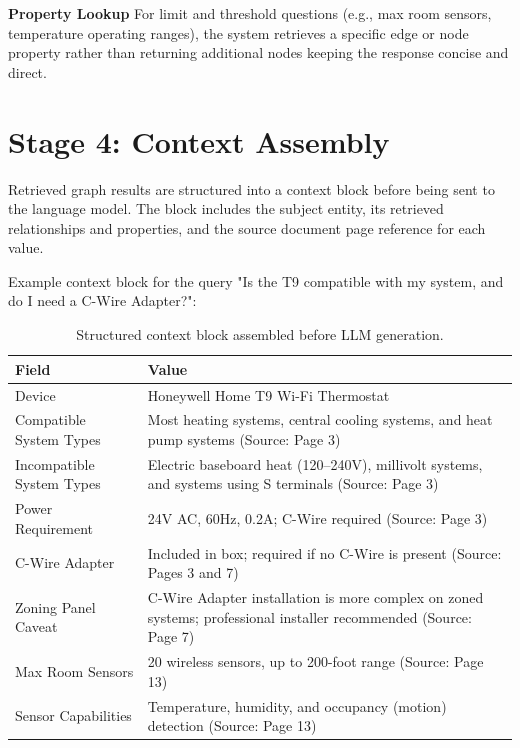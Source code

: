 \documentclass[11pt,a4paper]{article}
\begin{document}
\textbf{Property Lookup}
For limit and threshold questions (e.g., max room sensors, temperature operating ranges), the system retrieves a specific edge or node property rather than returning additional nodes keeping the response concise and direct.

\section{Stage 4: Context Assembly}
Retrieved graph results are structured into a context block before being sent to the language model. The block includes the subject entity, its retrieved relationships and properties, and the source document page reference for each value.

Example context block for the query "Is the T9 compatible with my system, and do I need a C-Wire Adapter?":

\begin{table}[H]
\centering
\small
\setlength{\tabcolsep}{6pt}
\begin{tabularx}{\textwidth}{L{0.30\textwidth}Y}
\toprule
{}
\textbf{Field} & \textbf{Value} \\
\midrule
Device & Honeywell Home T9 Wi-Fi Thermostat \\
Compatible System Types & Most heating systems, central cooling systems, and heat pump systems (Source: Page 3) \\
Incompatible System Types & Electric baseboard heat (120--240V), millivolt systems, and systems using S terminals (Source: Page 3) \\
Power Requirement & 24V AC, 60Hz, 0.2A; C-Wire required (Source: Page 3) \\
C-Wire Adapter & Included in box; required if no C-Wire is present (Source: Pages 3 and 7) \\
Zoning Panel Caveat & C-Wire Adapter installation is more complex on zoned systems; professional installer recommended (Source: Page 7) \\
Max Room Sensors & 20 wireless sensors, up to 200-foot range (Source: Page 13) \\
Sensor Capabilities & Temperature, humidity, and occupancy (motion) detection (Source: Page 13) \\
\bottomrule
\end{tabularx}
\caption{Structured context block assembled before LLM generation.}
\label{tab:context-block}
\end{table}
\end{document}
